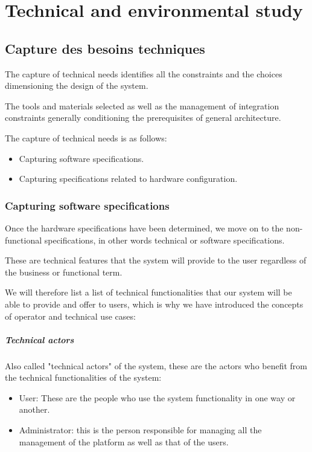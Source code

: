 

\chapter{Technical and environmental study}%
\label{chap:chapter_tree}

\section{Capture des besoins techniques}
The capture of technical needs identifies all the constraints and the choices dimensioning the design of the system.

The tools and materials selected as well as the management of integration constraints generally conditioning the prerequisites of general architecture.

The capture of technical needs is as follows:
\begin{itemize}\addtolength{\itemsep}{-0.35\baselineskip}
      \item
            Capturing software specifications.

      \item
            Capturing specifications related to hardware configuration.

\end{itemize}

\subsection{Capturing software specifications}
Once the hardware specifications have been determined, we move on to the non-functional specifications, in other words technical or software specifications.

These are technical features that the system will provide to the user regardless of the business or functional term.

We will therefore list a list of technical functionalities that our system will be able to provide and offer to users, which is why we have introduced the concepts of operator and technical use cases:

\paragraph{Technical actors}
Also called "technical actors" of the system, these are the actors who benefit from the technical functionalities of the system:
\begin{itemize}\addtolength{\itemsep}{-0.35\baselineskip}
      \item
            User: These are the people who use the system functionality in one way or another.
      \item
            Administrator: this is the person responsible for managing all the management of the platform as well as that of the users.
\end{itemize}

